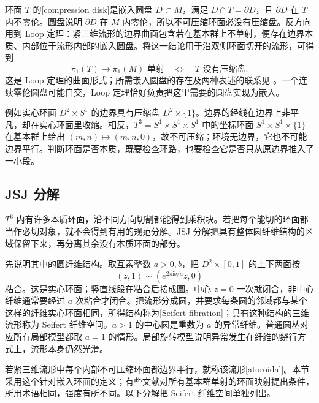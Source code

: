 环面 \(T\) 的[compression disk]是嵌入圆盘 \(D\subset M\)，满足 \(D\cap T=\partial D\)，且 \(\partial D\) 在 \(T\) 内不零伦。圆盘说明 \(\partial D\) 在 \(M\) 内零伦，所以不可压缩环面必没有压缩盘。反方向用到 Loop 定理：紧三维流形的边界曲面包含若在基本群上不单射，便存在边界本质、内部位于流形内部的嵌入圆盘。将这一结论用于沿双侧环面切开的流形，可得到
\[
	\pi_1(T)\longrightarrow\pi_1(M)\text{ 单射}
	\quad\Longleftrightarrow\quad
	T\text{ 没有压缩盘}.
\]
这是 Loop 定理的曲面形式；所需嵌入圆盘的存在及两种表述的联系见 \cite[第1.3—1.4节]{AschenbrennerFriedlWilton2015}。一个连续零伦圆盘可能自交，Loop 定理恰好负责把这里需要的圆盘实现为嵌入。

\ProseParagraphBreak

例如实心环面 \(D^2\times S^1\) 的边界具有压缩盘 \(D^2\times\{1\}\)。边界的经线在边界上非平凡，却在实心环面里收缩。相反，\(T^3=S^1\times S^1\times S^1\) 中的坐标环面 \(S^1\times S^1\times\{1\}\) 在基本群上给出 \((m,n)\mapsto(m,n,0)\)，故不可压缩；环境无边界，它也不可能边界平行。判断环面是否本质，既要检查环路，也要检查它是否只从原边界推入了一小段。

\subsection{JSJ 分解}
\label{g2:subsec:A04:03}

\(T^3\) 内有许多本质环面，沿不同方向切割都能得到乘积块。若把每个能切的环面都当作必切对象，就不会得到有用的规范分解。JSJ 分解把具有整体圆纤维结构的区域保留下来，再分离其余没有本质环面的部分。

\ProseParagraphBreak

先说明其中的圆纤维结构。取互素整数 \(a>0,b\)，把 \(D^2\times[0,1]\) 的上下两面按
\[
	(z,1)\sim(e^{2\pi\mathrm{i}b/a}z,0)
\]
粘合。这是实心环面；竖直线段在粘合后接成圆。中心 \(z=0\) 一次就闭合，非中心纤维通常要经过 \(a\) 次粘合才闭合。把流形分成圆，并要求每条圆的邻域都与某个这样的纤维实心环面相同，所得结构称为[Seifert fibration]；具有这种结构的三维流形称为 Seifert 纤维空间。\(a>1\) 的中心圆是重数为 \(a\) 的异常纤维。普通圆丛对应所有局部模型都取 \(a=1\) 的情形。局部旋转模型说明异常发生在纤维的绕行方式上，流形本身仍然光滑。

\ProseParagraphBreak

若紧三维流形中每个内部不可压缩环面都边界平行，就称该流形[atoroidal]。本节采用这个针对嵌入环面的定义；有些文献对所有基本群单射的环面映射提出条件，所用术语相同，强度有所不同。以下分解把 Seifert 纤维空间单独列出。

